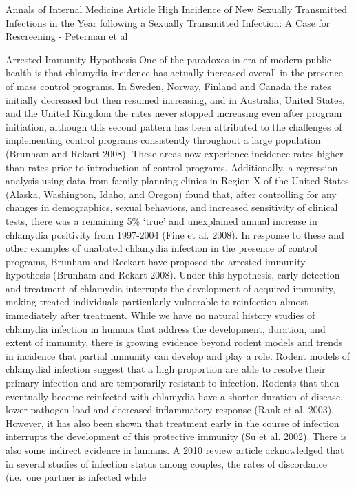 \documentclass [11pt, proquest] {uwthesis}[2015/03/03]
\begin{document}
Annals of Internal Medicine Article High Incidence of New Sexually
Transmitted Infections in the Year following a Sexually Transmitted
Infection: A Case for Rescreening - Peterman et al

Arrested Immunity Hypothesis One of the paradoxes in era of modern
public health is that chlamydia incidence has actually increased overall
in the presence of mass control programs. In Sweden, Norway, Finland and
Canada the rates initially decreased but then resumed increasing, and in
Australia, United States, and the United Kingdom the rates never stopped
increasing even after program initiation, although this second pattern
has been attributed to the challenges of implementing control programs
consistently throughout a large population (Brunham and Rekart 2008).
These areas now experience incidence rates higher than rates prior to
introduction of control programs. Additionally, a regression analysis
using data from family planning clinics in Region X of the United States
(Alaska, Washington, Idaho, and Oregon) found that, after controlling
for any changes in demographics, sexual behaviors, and increased
sensitivity of clinical tests, there was a remaining 5\% `true' and
unexplained annual increase in chlamydia positivity from 1997-2004 (Fine
et al. 2008). In response to these and other examples of unabated
chlamydia infection in the presence of control programs, Brunham and
Reckart have proposed the arrested immunity hypothesis (Brunham and
Rekart 2008). Under this hypothesis, early detection and treatment of
chlamydia interrupts the development of acquired immunity, making
treated individuals particularly vulnerable to reinfection almost
immediately after treatment. While we have no natural history studies of
chlamydia infection in humans that address the development, duration,
and extent of immunity, there is growing evidence beyond rodent models
and trends in incidence that partial immunity can develop and play a
role. Rodent models of chlamydial infection suggest that a high
proportion are able to resolve their primary infection and are
temporarily resistant to infection. Rodents that then eventually become
reinfected with chlamydia have a shorter duration of disease, lower
pathogen load and decreased inflammatory response (Rank et al. 2003).
However, it has also been shown that treatment early in the course of
infection interrupts the development of this protective immunity (Su et
al. 2002). There is also some indirect evidence in humans. A 2010 review
article acknowledged that in several studies of infection status among
couples, the rates of discordance (i.e.~one partner is infected while
\end{document}
